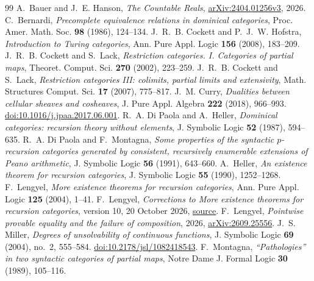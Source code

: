 \begin{thebibliography}{99}
\small
{}
A.~Bauer and J.~E. Hanson, \emph{The Countable Reals},
\href{https://arxiv.org/abs/2404.01256v3}{arXiv:2404.01256v3}, 2026.
C.~Bernardi, \emph{Precomplete equivalence relations in dominical
categories}, Proc. Amer. Math. Soc. \textbf{98} (1986), 124--134.
J.~R.~B. Cockett and P.~J.~W. Hofstra,
\emph{Introduction to Turing categories},
Ann. Pure Appl. Logic \textbf{156} (2008), 183--209.
J.~R.~B. Cockett and S.~Lack, \emph{Restriction categories. I.
Categories of partial maps}, Theoret. Comput. Sci. \textbf{270}
(2002), 223--259.
J.~R.~B. Cockett and S.~Lack,
\emph{Restriction categories III: colimits, partial limits and extensivity},
Math. Structures Comput. Sci. \textbf{17} (2007), 775--817.
J.~M. Curry, \emph{Dualities between cellular sheaves and cosheaves},
J. Pure Appl. Algebra \textbf{222} (2018), 966--993.
\href{https://doi.org/10.1016/j.jpaa.2017.06.001}
{doi:10.1016/j.jpaa.2017.06.001}.
R.~A. Di Paola and A.~Heller, \emph{Dominical categories:
recursion theory without elements}, J. Symbolic Logic
\textbf{52} (1987), 594--635.
R.~A. Di Paola and F.~Montagna, \emph{Some properties of the syntactic
$p$-recursion categories generated by consistent, recursively enumerable
extensions of Peano arithmetic}, J. Symbolic Logic \textbf{56} (1991),
643--660.
A.~Heller, \emph{An existence theorem for recursion categories},
J. Symbolic Logic \textbf{55} (1990), 1252--1268.
F.~Lengyel, \emph{More existence theorems for recursion categories},
Ann. Pure Appl. Logic \textbf{125} (2004), 1--41.
F.~Lengyel, \emph{Corrections to More existence theorems for recursion
categories}, version 10, 20 October 2026,
\href{https://github.com/flengyel/errata/blob/5555e4fa1da7b8e3a0836dd1fbf1ca385cacd03b/lengyel2004/lengyel2004_repairs_v10.tex}{source}.
F.~Lengyel, \emph{Pointwise provable equality and the failure of
composition}, 2026,
\href{https://arxiv.org/abs/2609.25556}{arXiv:2609.25556}.
J.~S. Miller, \emph{Degrees of unsolvability of continuous functions},
J. Symbolic Logic \textbf{69} (2004), no.~2, 555--584.
\href{https://doi.org/10.2178/jsl/1082418543}{doi:10.2178/jsl/1082418543}.
F.~Montagna, \emph{``Pathologies'' in two syntactic categories of partial
maps}, Notre Dame J. Formal Logic \textbf{30} (1989), 105--116.

\end{thebibliography}
